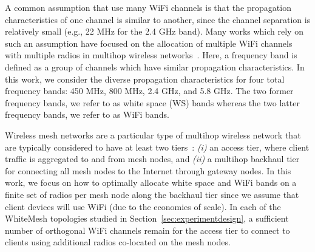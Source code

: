 %

A common assumption that use many WiFi channels is that the
propagation characteristics of one channel is similar to another, 
since the channel separation is relatively small (e.g., 22 MHz for 
the 2.4 GHz band).
Many works which rely on such an assumption have focused on the 
allocation of multiple WiFi channels with multiple radios in 
multihop wireless networks~\cite{si2010overview}.  Here, a frequency 
band is defined as a group of channels which have
similar propagation characteristics.
In this work, we consider the diverse propagation characteristics
for four total frequency bands: 450 MHz, 800 MHz, 2.4 GHz, and 5.8 GHz.
The two former frequency bands, we refer to as white space (WS) bands whereas
the two latter frequency bands, we refer to as WiFi bands.

Wireless mesh networks are a particular type of multihop wireless network
that are typically considered to have at least two
tiers~\cite{CRSK06}: {\it (i)} an access tier, where client traffic 
is aggregated to and from mesh nodes, and {\it (ii)} a multihop 
backhaul tier for connecting all mesh nodes to the Internet through 
gateway nodes. In this work, we focus on how to optimally allocate 
white space and WiFi bands on a finite set of radios per mesh node
along the backhaul tier since we assume that client devices will use 
WiFi (due to the economies of scale).  In each of the WhiteMesh 
topologies studied in Section~\ref{sec:experimentdesign}, a sufficient 
number of orthogonal WiFi channels remain for the access tier to 
connect to clients using additional radios co-located on the mesh nodes.

